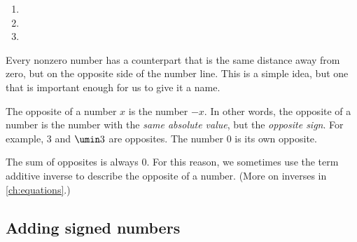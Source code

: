 \begin{boxex}
\begin{enumerate}[itemsep=10pt]
\item {}

\item {}

\item {}
\end{enumerate}
\end{boxex}

Every nonzero number has a counterpart that is the same distance away from zero, but on the opposite side of the number line. This is a simple idea, but one that is important enough for us to give it a name.

\begin{boxdef}[Opposite]
The \gls{opposite} of a number $x$ is the number $-x$. In other words, the opposite of a number is the number with the \textit{same absolute value}, but the \textit{opposite sign}. For example, 3 and $\umin3$ are opposites. The number 0 is its own opposite.

\begin{center}
\end{center}
\end{boxdef}

The sum of opposites is always 0. For this reason, we sometimes use the term \gls{additive inverse} to describe the opposite of a number. (More on inverses in \cref{ch:equations}.)

\subsection{Adding signed numbers}

